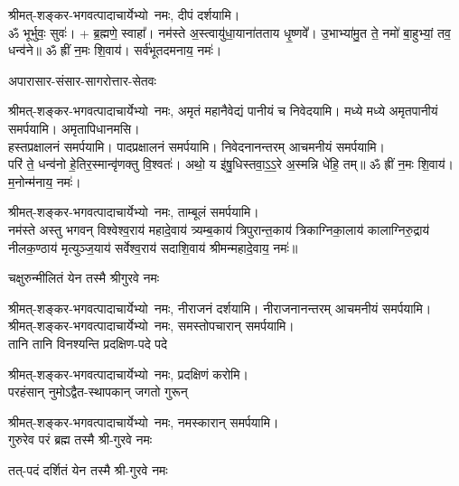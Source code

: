 \begin{center}
श्रीमत्-शङ्कर-भगवत्पादाचार्येभ्यो~नमः, दीपं दर्शयामि।\\


ॐ भूर्भुवः॒ सुवः॑। + ब्र॒ह्मणे॒ स्वाहा᳚। नम॑स्ते अ॒स्त्वायु॑धा॒याना॑तताय धृ॒ष्णवे᳚। उ॒भाभ्या॑मु॒त ते॒ नमो॑ बा॒हुभ्यां॒ तव॒ धन्व॑ने॥ ॐ ह्रीं न॒मः शि॒वाय॑। सर्व॑भूतदमनाय॒ नमः॑। 

{अपारासार-संसार-सागरोत्तार-सेतवः}

श्रीमत्-शङ्कर-भगवत्पादाचार्येभ्यो~नमः, अमृतं महानैवेद्यं पानीयं च निवेदयामि। मध्ये मध्ये अमृतपानीयं समर्पयामि। अमृतापिधानमसि।\\
हस्तप्रक्षालनं समर्पयामि। पादप्रक्षालनं समर्पयामि। निवेदनानन्तरम् आचमनीयं समर्पयामि।\\


परि॑ ते॒ धन्व॑नो हे॒तिर॒स्मान्वृ॑णक्तु वि॒श्वतः॑। अथो॒ य इ॑षु॒धिस्तवा॒ऽ॒ऽ॒रे अ॒स्मन्नि धे॑हि॒ तम्॥ ॐ ह्रीं न॒मः शि॒वाय॑। म॒नोन्म॑नाय॒ नमः॑। 


श्रीमत्-शङ्कर-भगवत्पादाचार्येभ्यो~नमः, ताम्बूलं समर्पयामि।\\

नम॑स्ते अस्तु भगवन् विश्वेश्व॒राय॑ महादे॒वाय॑ त्र्यम्ब॒काय॑ त्रिपुरान्त॒काय॑ त्रिकाग्निका॒लाय॑ कालाग्निरु॒द्राय॑ नीलक॒ण्ठाय॑ मृत्युञ्ज॒याय॑ सर्वेश्व॒राय॑ सदाशि॒वाय॑ श्रीमन्महादे॒वाय॒ नमः॑॥

{चक्षुरुन्मीलितं येन तस्मै श्रीगुरवे नमः}

श्रीमत्-शङ्कर-भगवत्पादाचार्येभ्यो~नमः, नीराजनं दर्शयामि। नीराजनानन्तरम् आचमनीयं समर्पयामि।\\

श्रीमत्-शङ्कर-भगवत्पादाचार्येभ्यो~नमः, समस्तोपचारान् समर्पयामि।\\


{तानि तानि विनश्यन्ति प्रदक्षिण-पदे पदे}

श्रीमत्-शङ्कर-भगवत्पादाचार्येभ्यो~नमः, प्रदक्षिणं करोमि।\\

{परहंसान् नुमोऽद्वैत-स्थापकान् जगतो गुरून्}

श्रीमत्-शङ्कर-भगवत्पादाचार्येभ्यो~नमः, नमस्कारान् समर्पयामि।\\

{गुरुरेव परं ब्रह्म तस्मै श्री-गुरवे नमः}

{तत्-पदं दर्शितं येन तस्मै श्री-गुरवे नमः}


\end{center}
